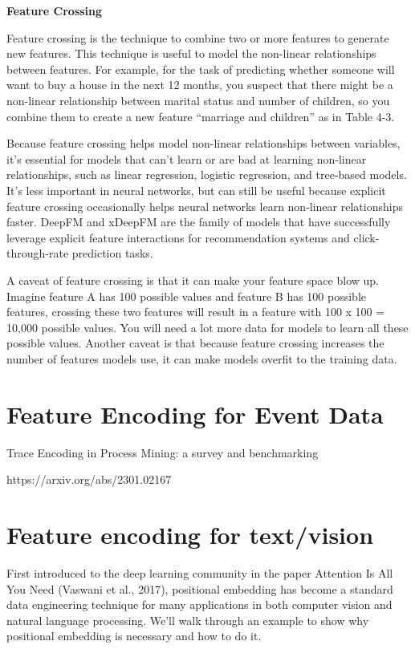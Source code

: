 \documentclass[openany]{book}
\begin{document}
\textbf{Feature Crossing}

Feature crossing is the technique to combine two or more features to generate new features. This technique is useful to model the non-linear relationships between features. For example, for the task of predicting whether someone will want to buy a house in the next 12 months, you suspect that there might be a non-linear relationship between marital status and number of children, so you combine them to create a new feature “marriage and children” as in Table 4-3.


Because feature crossing helps model non-linear relationships between variables, it’s essential for models that can’t learn or are bad at learning non-linear relationships, such as linear regression, logistic regression, and tree-based models. It’s less important in neural networks, but can still be useful because explicit feature crossing occasionally helps neural networks learn non-linear relationships faster. DeepFM and xDeepFM are the family of models that have successfully leverage explicit feature interactions for recommendation systems and click-through-rate prediction tasks.

A caveat of feature crossing is that it can make your feature space blow up. Imagine feature A has 100 possible values and feature B has 100 possible features, crossing these two features will result in a feature with 100 x 100 = 10,000 possible values. You will need a lot more data for models to learn all these possible values. Another caveat is that because feature crossing increases the number of features models use, it can make models overfit to the training data.



\section{Feature Encoding for Event Data}
Trace Encoding in Process Mining: a survey and benchmarking

https://arxiv.org/abs/2301.02167


\section{Feature encoding for text/vision}


First introduced to the deep learning community in the paper Attention Is All You Need (Vaswani et al., 2017), positional embedding has become a standard data engineering technique for many applications in both computer vision and natural language processing. We’ll walk through an example to show why positional embedding is necessary and how to do it.
\end{document}
